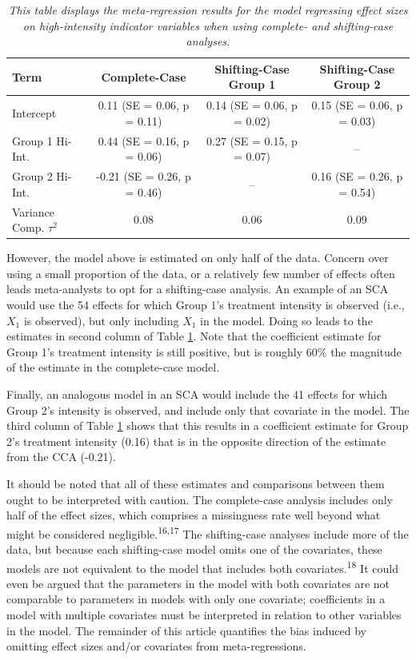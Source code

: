 \documentclass[
]{article}
\begin{document}
\begin{table}

\caption{\label{tab:unnamed-chunk-3}\label{tab:ccadtexample} \textit{This table displays the meta-regression results for the model regressing effect sizes on high-intensity indicator variables when using complete- and shifting-case analyses.}}
\centering
\begin{tabular}[t]{lccc}
\toprule
Term & Complete-Case & Shifting-Case Group 1 & Shifting-Case Group 2\\
\midrule
Intercept & 0.11 (SE = 0.06, p = 0.11) & 0.14 (SE = 0.06, p = 0.02) & 0.15 (SE = 0.06, p = 0.03)\\
Group 1 Hi-Int. & 0.44 (SE = 0.16, p = 0.06) & 0.27 (SE = 0.15, p = 0.07) & --\\
Group 2 Hi-Int. & -0.21 (SE = 0.26, p = 0.46) & -- & 0.16 (SE = 0.26, p = 0.54)\\
Variance Comp. $\tau^2$ & 0.08 & 0.06 & 0.09\\
\bottomrule
\end{tabular}
\end{table}

However, the model above is estimated on only half of the data.
Concern over using a small proportion of the data, or a relatively few number of effects often leads meta-analysts to opt for a shifting-case analysis.
An example of an SCA would use the 54 effects for which Group 1's treatment intensity is observed (i.e., \(X_{1}\) is observed), but only including \(X_{1}\) in the model.
Doing so leads to the estimates in second column of Table \ref{tab:ccadtexample}.
Note that the coefficient estimate for Group 1's treatment intensity is still positive, but is roughly 60\% the magnitude of the estimate in the complete-case model.

Finally, an analogous model in an SCA would include the 41 effects for which Group 2's intensity is observed, and include only that covariate in the model.
The third column of Table \ref{tab:ccadtexample} shows that this results in a coefficient estimate for Group 2's treatment intensity (0.16) that is in the opposite direction of the estimate from the CCA (-0.21).

It should be noted that all of these estimates and comparisons between them ought to be interpreted with caution.
The complete-case analysis includes only half of the effect sizes, which comprises a missingness rate well beyond what might be considered negligible.\textsuperscript{16,17}
The shifting-case analyses include more of the data, but because each shifting-case model omits one of the covariates, these models are not equivalent to the model that includes both covariates.\textsuperscript{18}
It could even be argued that the parameters in the model with both covariates are not comparable to parameters in models with only one covariate; coefficients in a model with multiple covariates must be interpreted in relation to other variables in the model.
The remainder of this article quantifies the bias induced by omitting effect sizes and/or covariates from meta-regressions.
\end{document}
